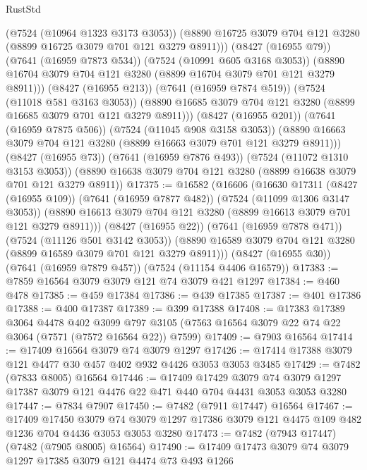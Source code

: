 \begin{lexlean}{RustStd}
\begin{coremodule}
            (@7524 (@10964 @1323 @3173 @3053))
            (@8890 @16725 @3079 @704 @121 @3280 (@8899 @16725 @3079 @701 @121 @3279 @8911)))
          (@8427 (@16955 @79))
          (@7641 (@16959 @7873 @534))
          (@7524 (@10991 @605 @3168 @3053))
          (@8890 @16704 @3079 @704 @121 @3280 (@8899 @16704 @3079 @701 @121 @3279 @8911)))
        (@8427 (@16955 @213))
        (@7641 (@16959 @7874 @519))
        (@7524 (@11018 @581 @3163 @3053))
        (@8890 @16685 @3079 @704 @121 @3280 (@8899 @16685 @3079 @701 @121 @3279 @8911)))
      (@8427 (@16955 @201))
      (@7641 (@16959 @7875 @506))
      (@7524 (@11045 @908 @3158 @3053))
      (@8890 @16663 @3079 @704 @121 @3280 (@8899 @16663 @3079 @701 @121 @3279 @8911)))
    (@8427 (@16955 @73))
    (@7641 (@16959 @7876 @493))
    (@7524 (@11072 @1310 @3153 @3053))
    (@8890 @16638 @3079 @704 @121 @3280 (@8899 @16638 @3079 @701 @121 @3279 @8911))
@17375 := @16582
    (@16606
      (@16630
        @17311
        (@8427 (@16955 @109))
        (@7641 (@16959 @7877 @482))
        (@7524 (@11099 @1306 @3147 @3053))
        (@8890 @16613 @3079 @704 @121 @3280 (@8899 @16613 @3079 @701 @121 @3279 @8911)))
      (@8427 (@16955 @22))
      (@7641 (@16959 @7878 @471))
      (@7524 (@11126 @501 @3142 @3053))
      (@8890 @16589 @3079 @704 @121 @3280 (@8899 @16589 @3079 @701 @121 @3279 @8911)))
    (@8427 (@16955 @30))
    (@7641 (@16959 @7879 @457))
    (@7524 (@11154 @4406 @16579))
@17383 := @7859 @16564 @3079 @3079 @121 @74 @3079 @421 @1297
@17384 := @460 @478
@17385 := @459 @17384
@17386 := @439 @17385
@17387 := @401 @17386
@17388 := @400 @17387
@17389 := @399 @17388
@17408 := @17383
    @17389
    @3064
    @4478
    @402
    @3099
    @797
    @3105
    (@7563 @16564 @3079 @22 @74 @22 @3064 (@7571 (@7572 @16564 @22)) @7599)
@17409 := @7903 @16564
@17414 := @17409 @16564 @3079 @74 @3079 @1297
@17426 := @17414 @17388 @3079 @121 @4477 @30 @457 @402 @932 @4426 @3053 @3053 @3485
@17429 := @7482 (@7833 @8005) @16564
@17446 := @17409
    @17429
    @3079
    @74
    @3079
    @1297
    @17387
    @3079
    @121
    @4476
    @22
    @471
    @440
    @704
    @4431
    @3053
    @3053
    @3280
@17447 := @7834 @7907
@17450 := @7482 (@7911 @17447) @16564
@17467 := @17409
    @17450
    @3079
    @74
    @3079
    @1297
    @17386
    @3079
    @121
    @4475
    @109
    @482
    @1236
    @704
    @4436
    @3053
    @3053
    @3280
@17473 := @7482 (@7943 @17447) (@7482 (@7905 @8005) @16564)
@17490 := @17409
    @17473
    @3079
    @74
    @3079
    @1297
    @17385
    @3079
    @121
    @4474
    @73
    @493
    @1266

\end{coremodule}
\end{lexlean}
